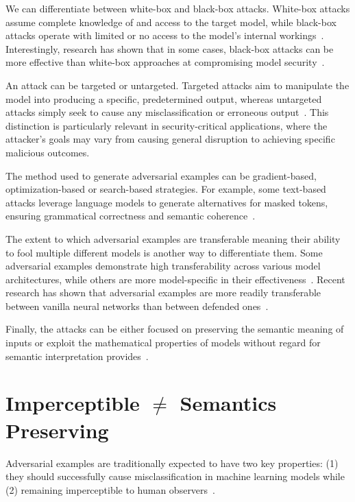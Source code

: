 \documentclass[a4paper, oneside]{discothesis}
\begin{document}
We can differentiate between white-box and black-box attacks. White-box attacks assume complete knowledge of and access to the target model, while black-box attacks operate with limited or no access to the model's internal workings~\cite{capozzi2024adversarial}. Interestingly, research has shown that in some cases, black-box attacks can be more effective than white-box approaches at compromising model security~\cite{capozzi2024adversarial}.

An attack can be targeted or untargeted. Targeted attacks aim to manipulate the model into producing a specific, predetermined output, whereas untargeted attacks simply seek to cause any misclassification or erroneous output~\cite{capozzi2024adversarial, Kashyap2024AdversarialAA}. This distinction is particularly relevant in security-critical applications, where the attacker's goals may vary from causing general disruption to achieving specific malicious outcomes.

The method used to generate adversarial examples can be gradient-based, optimization-based or search-based strategies. For example, some text-based attacks leverage language models to generate alternatives for masked tokens, ensuring grammatical correctness and semantic coherence~\cite{garg2020bae}.

The extent to which adversarial examples are transferable \textendash{} meaning their ability to fool multiple different models \textendash{} is another way to differentiate them. Some adversarial examples demonstrate high transferability across various model architectures, while others are more model-specific in their effectiveness~\cite{Li2022ASO, li2022review}. Recent research has shown that adversarial examples are more readily transferable between vanilla neural networks than between defended ones~\cite{li2019nattack, zheng2023black}.

Finally, the attacks can be either focused on preserving the semantic meaning of inputs or exploit the mathematical properties of models without regard for semantic interpretation provides~\cite{browne2020semantics}.

\section{Imperceptible $\not=$ Semantics Preserving}

Adversarial examples are traditionally expected to have two key properties: (1) they should successfully cause misclassification in machine learning models while (2) remaining imperceptible to human observers~\cite{cubuk2017intriguing}.
\end{document}
